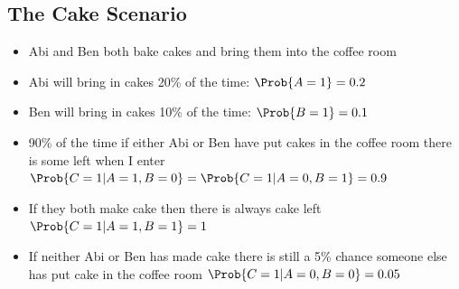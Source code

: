 
\begin{slide}
\section[-2]{The Cake Scenario}

\begin{PauseHighLight}\squeeze
  \begin{itemize}
  \item Abi and Ben both bake cakes and bring them into the
    coffee room\pause
  \item Abi will bring in cakes 20\% of the time: \(\Prob{A=1} = 0.2\)\pause
  \item Ben will bring in cakes 10\% of the time: \(\Prob{B=1} = 0.1\)\pause
  \item 90\% of the time if either Abi or Ben have put cakes in the
    coffee room there is some left when I enter
    \(\Prob{C=1|A=1,B=0} = \Prob{C=1|A=0,B=1}=0.9\)\pause
  \item If they both make cake then there is always cake left  \(\Prob{C=1|A=1,B=1}=1\)\pause
  \item If neither Abi or Ben has made cake there is still a 5\%
    chance someone else has put cake in the coffee room \(\Prob{C=1|A=0,B=0}=0.05\)\pause
  \end{itemize}
\end{PauseHighLight}


\end{slide}


